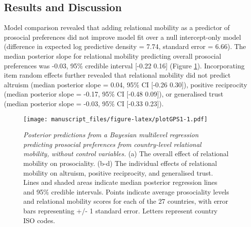 \documentclass[
  man,floatsintext]{apa6}
\begin{document}
\hypertarget{results-and-discussion}{%
\subsection{Results and Discussion}\label{results-and-discussion}}

Model comparison revealed that adding relational mobility as a predictor of prosocial preferences did not improve model fit over a null intercept-only model (difference in expected log predictive density = 7.74, standard error = 6.66). The median posterior slope for relational mobility predicting overall prosocial preferences was -0.03, 95\% credible interval {[}-0.22 0.16{]} (Figure \ref{fig:plotGPS1}). Incorporating item random effects further revealed that relational mobility did not predict altruism (median posterior slope = 0.04, 95\% CI {[}-0.26 0.30{]}), positive reciprocity (median posterior slope = -0.17, 95\% CI {[}-0.48 0.09{]}), or generalised trust (median posterior slope = -0.03, 95\% CI {[}-0.33 0.23{]}).



\begin{figure}
\centering
\texttt{[image: manuscript\_files/figure-latex/plotGPS1-1.pdf]}
\caption{\label{fig:plotGPS1}\emph{Posterior predictions from a Bayesian multilevel regression predicting prosocial preferences from country-level relational mobility, without control variables.} (a) The overall effect of relational mobility on prosociality. (b-d) The individual effects of relational mobility on altruism, positive reciprocity, and generalised trust. Lines and shaded areas indicate median posterior regression lines and 95\% credible intervals. Points indicate average prosociality levels and relational mobility scores for each of the 27 countries, with error bars representing +/- 1 standard error. Letters represent country ISO codes.}
\end{figure}
\end{document}
